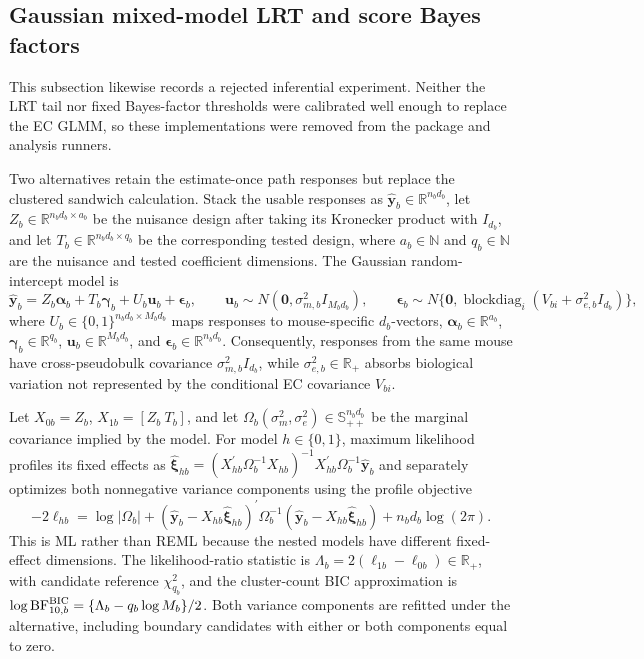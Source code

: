 \documentclass[11pt]{article}
\begin{document}
\subsection*{Gaussian mixed-model LRT and score Bayes factors}

This subsection likewise records a rejected inferential experiment. Neither the LRT tail nor fixed Bayes-factor thresholds were calibrated well enough to replace the EC GLMM, so these implementations were removed from the package and analysis runners.

Two alternatives retain the estimate-once path responses but replace the clustered sandwich calculation. Stack the usable responses as \(\widehat{\bm y}_b\in\mathbb R^{n_bd_b}\), let \(Z_b\in\mathbb R^{n_bd_b\times a_b}\) be the nuisance design after taking its Kronecker product with \(I_{d_b}\), and let \(T_b\in\mathbb R^{n_bd_b\times q_b}\) be the corresponding tested design, where \(a_b\in\mathbb N\) and \(q_b\in\mathbb N\) are the nuisance and tested coefficient dimensions. The Gaussian random-intercept model is \[\widehat{\bm y}_b=Z_b\bm\alpha_b+T_b\bm\gamma_b+U_b\bm u_b+\bm\epsilon_b,\qquad \bm u_b\sim N(\bm0,\sigma_{m,b}^2I_{M_bd_b}),\qquad \bm\epsilon_b\sim N\{\bm0,\operatorname{blockdiag}_i(V_{bi}+\sigma_{e,b}^2I_{d_b})\},\] where \(U_b\in\{0,1\}^{n_bd_b\times M_bd_b}\) maps responses to mouse-specific \(d_b\)-vectors, \(\bm\alpha_b\in\mathbb R^{a_b}\), \(\bm\gamma_b\in\mathbb R^{q_b}\), \(\bm u_b\in\mathbb R^{M_bd_b}\), and \(\bm\epsilon_b\in\mathbb R^{n_bd_b}\). Consequently, responses from the same mouse have cross-pseudobulk covariance \(\sigma_{m,b}^2I_{d_b}\), while \(\sigma_{e,b}^2\in\mathbb R_+\) absorbs biological variation not represented by the conditional EC covariance \(V_{bi}\).

Let \(X_{0b}=Z_b\), \(X_{1b}=[Z_b\ T_b]\), and let \(\Omega_b(\sigma_m^2,\sigma_e^2)\in\mathbb S_{++}^{n_bd_b}\) be the marginal covariance implied by the model. For model \(h\in\{0,1\}\), maximum likelihood profiles its fixed effects as \(\widehat{\bm\xi}_{hb}=(X_{hb}^\prime\Omega_b^{-1}X_{hb})^{-1}X_{hb}^\prime\Omega_b^{-1}\widehat{\bm y}_b\) and separately optimizes both nonnegative variance components using the profile objective \[-2\ell_{hb}=\log|\Omega_b|+(\widehat{\bm y}_b-X_{hb}\widehat{\bm\xi}_{hb})^\prime\Omega_b^{-1}(\widehat{\bm y}_b-X_{hb}\widehat{\bm\xi}_{hb})+n_bd_b\log(2\pi).\] This is ML rather than REML because the nested models have different fixed-effect dimensions. The likelihood-ratio statistic is \(\Lambda_b=2(\ell_{1b}-\ell_{0b})\in\mathbb R_+\), with candidate reference \(\chi^2_{q_b}\), and the cluster-count BIC approximation is \(\log\mathrm{BF}^{\rm BIC}_{10,b}=\{\Lambda_b-q_b\log M_b\}/2\). Both variance components are refitted under the alternative, including boundary candidates with either or both components equal to zero.
\end{document}
